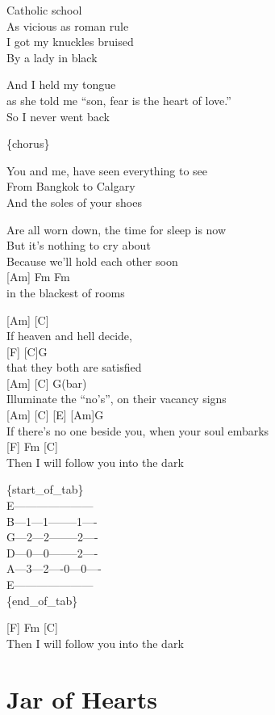 \documentclass[
  letterpaper,
  DIV=11,
  numbers=noendperiod]{scrreprt}
\begin{document}
Catholic school\\
As vicious as roman rule\\
I got my knuckles bruised\\
By a lady in black

And I held my tongue\\
as she told me ``son, fear is the heart of love.''\\
So I never went back

\{chorus\}

You and me, have seen everything to see\\
From Bangkok to Calgary\\
And the soles of your shoes

Are all worn down, the time for sleep is now\\
But it's nothing to cry about\\
Because we'll hold each other soon\\
{[}Am{]} Fm Fm\\
in the blackest of rooms

{[}Am{]} {[}C{]}\\
If heaven and hell decide,\\
{[}F{]} {[}C{]}G\\
that they both are satisfied\\
{[}Am{]} {[}C{]} G(bar)\\
Illuminate the ``no's'', on their vacancy signs\\
{[}Am{]} {[}C{]} {[}E{]} {[}Am{]}G\\
If there's no one beside you, when your soul embarks\\
{[}F{]} Fm {[}C{]}\\
Then I will follow you into the dark

\{start\_of\_tab\}\\
E---------------------\textbar{}\\
B---1---1--------1----\textbar{}\\
G---2---2--------2----\textbar{}\\
D---0---0--------2----\textbar{}\\
A---3---2----0---0----\textbar{}\\
E---------------------\textbar{}\\
\{end\_of\_tab\}

{[}F{]} Fm {[}C{]}\\
Then I will follow you into the dark

\hypertarget{jar-of-hearts}{%
\chapter{Jar of Hearts}\label{jar-of-hearts}}
\end{document}
